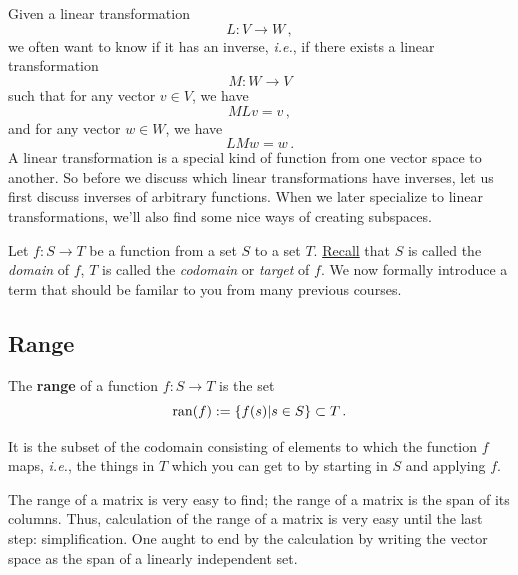 

\chapter{}\label{kernelrank}

Given a linear transformation \[L \colon V \to W\, ,\] we often want  to know if it has an inverse, {\itshape i.e.}, if there exists a linear transformation \[M \colon W \to V\] such that for any vector \(v \in V\), we have \[MLv=v\, ,\] and for any vector \(w \in W\), we have \[LMw=w\, .\] A linear transformation is a special kind of function from one vector space to another. So before we discuss which linear transformations have inverses, let us first discuss inverses of arbitrary functions. When we later specialize to linear transformations, we'll also find some nice ways of creating subspaces.

Let \(f \colon S \to T\) be a function from a set \(S\) to a set \(T\). \href{\webworkurl Homework0-Background/3/}{Recall} that \(S\) is called the {\itshape domain} of \(f\), \(T\) is called the {\itshape codomain} or {\itshape target} of \(f\).  
We now formally introduce a term that should be familar to you from many previous courses.

\section{Range}

\begin{definition} 
The {\bf range}  of a function $f:S\to T$ is  the set
\[
{\rm ran}(f):=\left\{ f(s) | s\in S \right\}\subset T\, .
\]
\end{definition} 
It is the subset of the codomain consisting of elements  to which the function \(f\) maps, {\itshape i.e.}, the things in \(T\) which you can get to by starting in \(S\) and applying \(f\). 

The range of a matrix is very easy to find; the range of a matrix is the span of its columns. 
Thus, calculation of the range of a matrix is very easy until the last step: simplification. One aught to end by the calculation by writing the vector space as the span of a linearly independent set. 

